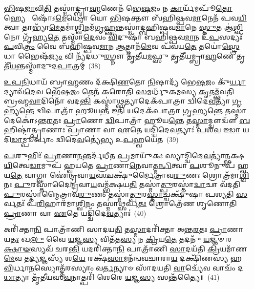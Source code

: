 \-\ul{𑌭𑌿}\-𑌷\-\ul{𑌜𑌾}\-𑌵𑌿\-\ul{𑌤𑌿} 𑌤𑌸𑍍𑌮𑌾॑𑌦𑍍𑌬𑍍𑌰𑌾\-\ul{𑌹𑍍𑌮}\-𑌣𑍇𑌨᳴ 𑌭𑍇\-\ul{𑌷}\-𑌜𑌂 𑌨 \ul{𑌕𑌾}\-𑌰𑍍𑌯᳴𑌮𑌪𑍂᳴\-\ul{𑌤𑍋} 𑌹𑍍𑌯𑍇  𑌷𑍋᳴\-𑌽\-\ul{𑌮𑍇}\-𑌧𑍍𑌯𑍋 𑌯𑍋 \ul{𑌭𑌿}\-𑌷𑌕𑍍𑌤𑍗 𑌬᳴𑌹𑌿𑌷𑍍𑌪𑌵\-\ul{𑌮𑌾}\-𑌨𑍇𑌨᳴ 𑌪𑌵\-\ul{𑌯𑌿}\-𑌤𑍍𑌵𑌾 𑌤𑌾𑌭𑍍𑌯𑌾᳴\-\ul{𑌮𑍇}\-𑌤𑌮𑌾॑\-\ul{𑌶𑍍𑌵𑌿}\-𑌨𑌮᳴𑌗𑍃\-\ul{𑌹𑍍𑌣}\-𑌨𑍍𑌤𑌸𑍍𑌮𑌾॑𑌦𑍍𑌬𑌹𑌿𑌷𑍍𑌪𑌵\-\ul{𑌮𑌾}\-𑌨𑍇 \ul{𑌸𑍍𑌤𑍁}\-𑌤 𑌆॑\-\ul{𑌶𑍍𑌵𑌿}\-𑌨𑍋 𑌗𑍃᳴𑌹𑍍𑌯\-\ul{𑌤𑍇} 𑌤𑌸𑍍𑌮𑌾᳴\-\ul{𑌦𑍇}\-𑌵𑌂 \ul{𑌵𑌿}\-𑌦𑍁𑌷𑌾᳴ 𑌬𑌹𑌿𑌷𑍍𑌪𑌵\-\ul{𑌮𑌾}\-𑌨 𑌉᳴\-\ul{𑌪}\-𑌸𑌦𑍍𑌯𑌃᳴ \ul{𑌪}\-𑌵𑌿\-\ul{𑌤𑍍𑌰𑌂} 𑌵𑍈 𑌬᳴𑌹𑌿𑌷𑍍𑌪𑌵\-\ul{𑌮𑌾}\-𑌨 \ul{𑌆}\-𑌤𑍍𑌮𑌾𑌨᳴\-\ul{𑌮𑍇}\-𑌵 𑌪᳴𑌵𑌯\-\ul{𑌤𑍇} 𑌤𑌯𑍋॑\-\ul{𑌸𑍍𑌤𑍍𑌰𑍇}\-𑌧𑌾 𑌭𑍈𑌷᳴\-\ul{𑌜𑍍𑌯𑌂} 𑌵𑌿 𑌨𑍍𑌯᳴𑌦𑌧𑍁\-\ul{𑌰}\-𑌗𑍍𑌨𑍗 𑌤𑍃᳴𑌤𑍀𑌯\-\ul{𑌮}\-𑌫𑍍𑌸𑍁 𑌤𑍃𑌤𑍀᳴𑌯𑌮𑍍𑌬𑍍𑌰𑌾\-\ul{𑌹𑍍𑌮}\-𑌣𑍇 𑌤𑍃𑌤𑍀᳴\-\ul{𑌯}\-𑌨𑍍𑌤𑌸𑍍𑌮𑌾᳴𑌦𑍁𑌦\-\ul{𑌪𑌾}\-𑌤𑍍𑌰𑌮𑍍~(38)

\-\ul{𑌉}\-\-\ul{𑌪}\-\-\ul{𑌨𑌿}\-𑌧𑌾𑌯᳴ 𑌬𑍍𑌰𑌾\-\ul{𑌹𑍍𑌮}\-𑌣𑌂 𑌦᳴𑌕𑍍𑌷𑌿\-\ul{𑌣}\-𑌤𑍋 \ul{𑌨𑌿}\-𑌷𑌾𑌦𑍍𑌯᳴ 𑌭𑍇\-\ul{𑌷}\-𑌜𑌂 𑌕𑍁᳴\-\ul{𑌰𑍍𑌯𑌾}\-𑌦𑍍𑌯𑌾𑌵᳴\-\ul{𑌦𑍇}\-𑌵 𑌭𑍇᳴\-\ul{𑌷}\-𑌜𑌂 𑌤𑍇𑌨᳴ 𑌕𑌰𑍋𑌤𑌿 \ul{𑌸}\-𑌮𑌰𑍍𑌧𑍁᳴𑌕𑌮𑌸𑍍𑌯 \ul{𑌕𑍃}\-𑌤𑌮𑍍𑌭᳴𑌵𑌤𑌿 𑌬𑍍𑌰𑌹𑍍𑌮\-\ul{𑌵𑌾}\-𑌦𑌿𑌨𑍋᳴ 𑌵𑌦\-\ul{𑌨𑍍𑌤𑌿} 𑌕𑌸𑍍𑌮𑌾॑\-\ul{𑌥𑍍𑌸}\-𑌤𑍍𑌯𑌾𑌦𑍇𑌕᳴𑌪𑌾𑌤𑍍𑌰𑌾 𑌦𑍍𑌵𑌿𑌦𑍇\-\ul{𑌵}\-𑌤𑍍𑌯𑌾᳴ \ul{𑌗𑍃}\-𑌹𑍍𑌯𑌨𑍍𑌤𑍇॑ \ul{𑌦𑍍𑌵𑌿}\-𑌪𑌾𑌤𑍍𑌰𑌾᳴ 𑌹𑍂𑌯\-\ul{𑌨𑍍𑌤} 𑌇\-\ul{𑌤𑌿} 𑌯𑌦𑍇𑌕᳴𑌪𑌾𑌤𑍍𑌰𑌾 \ul{𑌗𑍃}\-𑌹𑍍𑌯\-\ul{𑌨𑍍𑌤𑍇} 𑌤\-\ul{𑌸𑍍𑌮𑌾}\-𑌦𑍇𑌕𑍋॑\-𑌽𑌨𑍍𑌤\-\ul{𑌰}\-𑌤𑌃 \ul{𑌪𑍍𑌰𑌾}\-𑌣𑍋 \ul{𑌦𑍍𑌵𑌿}\-𑌪𑌾𑌤𑍍𑌰𑌾᳴ 𑌹𑍂𑌯\-\ul{𑌨𑍍𑌤𑍇} 𑌤\-\ul{𑌸𑍍𑌮𑌾}\-𑌦𑍍𑌦𑍍𑌵𑍗𑌦𑍍𑌵𑍗᳴ \ul{𑌬}\-𑌹𑌿𑌷𑍍𑌟𑌾॑\-\ul{𑌤𑍍𑌪𑍍𑌰𑌾}\-𑌣𑌾𑌃 \ul{𑌪𑍍𑌰𑌾}\-𑌣𑌾 𑌵𑌾 \ul{𑌏}\-𑌤𑍇 𑌯𑌦𑍍𑌦𑍍𑌵𑌿᳴𑌦𑍇\-\ul{𑌵}\-𑌤𑍍𑌯𑌾𑌃॑ \ul{𑌪}\-𑌶\-\ul{𑌵} 𑌇\-\ul{𑌡𑌾} 𑌯𑌦𑌿\-\ul{𑌡𑌾}\-𑌮𑍍𑌪𑍂𑌰𑍍𑌵𑌾𑌂॑ 𑌦𑍍𑌵𑌿𑌦𑍇\-\ul{𑌵}\-𑌤𑍍𑌯𑍇॑𑌭𑍍𑌯 𑌉\-\ul{𑌪}\-𑌹𑍍𑌵𑌯𑍇᳴𑌤~(39)

\-\ul{𑌪}\-𑌶𑍁𑌭𑌿𑌃᳴ \ul{𑌪𑍍𑌰𑌾}\-𑌣𑌾\-\ul{𑌨}\-𑌨𑍍𑌤𑌰𑍍𑌦᳴𑌧𑍀𑌤 \ul{𑌪𑍍𑌰}\-𑌮𑌾𑌯𑍁᳴𑌕𑌃 𑌸𑍍𑌯𑌾𑌦𑍍𑌦𑍍𑌵𑌿𑌦𑍇\-\ul{𑌵}\-𑌤𑍍𑌯𑌾॑𑌨𑍍𑌭𑌕𑍍𑌷\-\ul{𑌯𑌿}\-𑌤𑍍𑌵𑍇\-\ul{𑌡𑌾}\-𑌮𑍁𑌪᳴ 𑌹𑍍𑌵𑌯𑌤𑍇 \ul{𑌪𑍍𑌰𑌾}\-𑌣𑌾\-\ul{𑌨𑍇}\-𑌵𑌾𑌤𑍍𑌮\-\ul{𑌨𑍍𑌧𑌿}\-𑌤𑍍𑌵𑌾 \ul{𑌪}\-𑌶𑍂𑌨𑍁𑌪᳴ 𑌹𑍍𑌵𑌯\-\ul{𑌤𑍇} 𑌵𑌾𑌗𑍍𑌵𑌾 𑌐॑𑌨𑍍𑌦𑍍𑌰𑌵𑌾\-\ul{𑌯}\-𑌵𑌶𑍍𑌚𑌕𑍍𑌷𑍁᳴𑌰𑍍𑌮𑍈𑌤𑍍𑌰𑌾𑌵\-\ul{𑌰𑍁}\-𑌣𑌃 𑌶𑍍𑌰𑍋𑌤𑍍𑌰᳴𑌮𑌾\-\ul{𑌶𑍍𑌵𑌿}\-𑌨𑌃 \ul{𑌪𑍁}\-𑌰𑌸𑍍𑌤𑌾᳴𑌦𑍈𑌨𑍍𑌦𑍍𑌰𑌵𑌾\-\ul{𑌯}\-𑌵𑌮𑍍𑌭᳴𑌕𑍍𑌷𑌯\-\ul{𑌤𑌿} 𑌤𑌸𑍍𑌮𑌾॑\-\ul{𑌤𑍍𑌪𑍁}\-𑌰𑌸𑍍𑌤𑌾॑\-\ul{𑌦𑍍𑌵𑌾}\-𑌚𑌾 𑌵᳴𑌦𑌤𑌿 \ul{𑌪𑍁}\-𑌰𑌸𑍍𑌤𑌾॑𑌨𑍍𑌮𑍈𑌤𑍍𑌰𑌾𑌵\-\ul{𑌰𑍁}\-𑌣𑌂 𑌤𑌸𑍍𑌮𑌾॑\-\ul{𑌤𑍍𑌪𑍁}\-𑌰\-\ul{𑌸𑍍𑌤𑌾}\-𑌚𑍍𑌚𑌕𑍍𑌷𑍁᳴𑌷𑌾 𑌪𑌶𑍍𑌯𑌤𑌿 \ul{𑌸}\-𑌰𑍍𑌵𑌤𑌃᳴ 𑌪\-\ul{𑌰𑌿}\-𑌹𑌾𑌰᳴𑌮𑌾\-\ul{𑌶𑍍𑌵𑌿}\-𑌨𑌂 𑌤𑌸𑍍𑌮𑌾॑\-\ul{𑌥𑍍𑌸}\-𑌰𑍍𑌵\-\ul{𑌤𑌃} 𑌶𑍍𑌰𑍋𑌤𑍍𑌰𑍇᳴𑌣 𑌶𑍃𑌣𑍋𑌤𑌿 \ul{𑌪𑍍𑌰𑌾}\-𑌣𑌾 𑌵𑌾 \ul{𑌏}\-𑌤𑍇 𑌯𑌦𑍍𑌦𑍍𑌵𑌿᳴𑌦𑍇\-\ul{𑌵}\-𑌤𑍍𑌯𑌾𑌃॑~(40)

𑌅𑌰𑌿᳴𑌕𑍍𑌤𑌾\-\ul{𑌨𑌿} 𑌪𑌾𑌤𑍍𑌰𑌾᳴𑌣𑌿 𑌸𑌾𑌦𑌯\-\ul{𑌤𑌿} 𑌤\-\ul{𑌸𑍍𑌮𑌾}\-𑌦𑌰𑌿᳴𑌕𑍍𑌤𑌾 𑌅𑌨𑍍𑌤\-\ul{𑌰}\-𑌤𑌃 \ul{𑌪𑍍𑌰𑌾}\-𑌣𑌾 𑌯\-\ul{𑌤𑌃} 𑌖\-\ul{𑌲𑍁} 𑌵𑍈 \ul{𑌯}\-𑌜𑍍𑌞\-\ul{𑌸𑍍𑌯} 𑌵𑌿𑌤᳴𑌤\-\ul{𑌸𑍍𑌯} 𑌨 \ul{𑌕𑍍𑌰𑌿}\-𑌯\-\ul{𑌤𑍇} 𑌤𑌦𑌨𑍁᳴ \ul{𑌯}\-𑌜𑍍𑌞𑍞 𑌰\-\ul{𑌕𑍍𑌷𑌾}\-\-\ul{𑍟}\-𑌸𑍍𑌯𑌵᳴ 𑌚𑌰\-\ul{𑌨𑍍𑌤𑌿} 𑌯𑌦𑌰𑌿᳴𑌕𑍍𑌤𑌾\-\ul{𑌨𑌿} 𑌪𑌾𑌤𑍍𑌰𑌾᳴𑌣𑌿 \ul{𑌸𑌾}\-𑌦𑌯᳴𑌤𑌿 \ul{𑌕𑍍𑌰𑌿}\-𑌯𑌮𑌾᳴𑌣\-\ul{𑌮𑍇}\-𑌵 𑌤\-\ul{𑌦𑍍𑌯}\-𑌜𑍍𑌞𑌸𑍍𑌯᳴ 𑌶\-\ul{𑌯𑍇} 𑌰𑌕𑍍𑌷᳴\-\ul{𑌸𑌾}\-𑌮𑌨᳴𑌨𑍍𑌵𑌵𑌚𑌾𑌰𑌾\-\ul{𑌯} 𑌦𑌕𑍍𑌷𑌿᳴𑌣𑌸𑍍𑌯 𑌹\-\ul{𑌵𑌿}\-𑌰𑍍𑌧𑌾\-\ul{𑌨}\-𑌸𑍍𑌯𑍋𑌤𑍍𑌤᳴𑌰𑌸𑍍𑌯𑌾𑌂 𑌵\-\ul{𑌰𑍍𑌤}\-𑌨𑍍𑌯𑌾𑍞 𑌸𑌾᳴𑌦𑌯𑌤𑌿 \ul{𑌵𑌾}\-𑌚𑍍𑌯𑍇᳴𑌵 𑌵𑌾𑌚𑌂᳴ 𑌦\-\ul{𑌧𑌾}\-𑌤𑍍𑌯𑌾 𑌤𑍃᳴𑌤𑍀𑌯𑌸\-\ul{𑌵}\-𑌨𑌾𑌤𑍍𑌪𑌰𑌿᳴ 𑌶𑍇𑌰𑍇 \ul{𑌯}\-𑌜𑍍𑌞\-\ul{𑌸𑍍𑌯} 𑌸𑌨𑍍𑌤᳴𑌤𑍍𑌯𑍈॥~(41)

